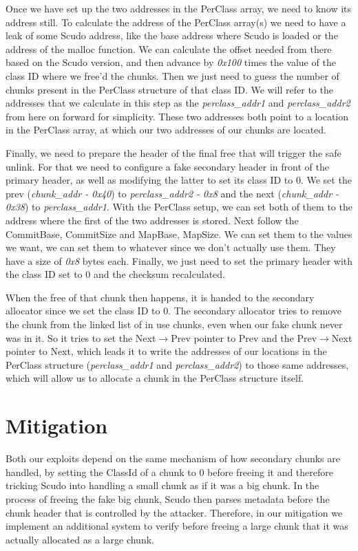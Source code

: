 \documentclass[a4paper,11pt,oneside]{report}
\begin{document}
Once we have set up the two addresses in the PerClass array, we need to know its address
still. To calculate the address of the PerClass array(s) we need to have a leak of some
Scudo address, like the base address where Scudo is loaded or the address of the malloc
function. We can calculate the offset needed from there based on the Scudo version, and
then advance by \emph{0x100} times the value of the class ID where we free'd the
chunks. Then we just need to guess the number of chunks present in the PerClass structure
of that class ID. We will refer to the addresses that we calculate in this step as the
\emph{perclass\_addr1} and \emph{perclass\_addr2} from here on forward for simplicity. These
two addresses both point to a location in the PerClass array, at which our two addresses
of our chunks are located.

Finally, we need to prepare the header of the final free that will trigger the safe
unlink. For that we need to configure a fake secondary header in front of the primary
header, as well as modifying the latter to set its class ID to 0. We set the prev
(\emph{chunk\_addr - 0x40}) to \emph{perclass\_addr2 - 0x8} and the next
(\emph{chunk\_addr - 0x38}) to \emph{perclass\_addr1}. With the PerClass setup, we
can set both of them to the address where the first of the two addresses is stored.  Next
follow the CommitBase, CommitSize and MapBase, MapSize. We can set them to the values we
want, we can set them to whatever since we don't actually use them. They have a size of
\emph{0x8} bytes each.  Finally, we just need to set the primary header with the class ID
set to 0 and the checksum recalculated.

When the free of that chunk then happens, it is handed to the secondary allocator since we
set the class ID to 0. The secondary allocator tries to remove the chunk from the linked
list of in use chunks, even when our fake chunk never was in it. So it tries to set the
Next$\rightarrow$Prev pointer to Prev and the Prev$\rightarrow$Next pointer to Next, which
leads it to write the addresses of our locations in the PerClass structure
(\emph{perclass\_addr1} and \emph{perclass\_addr2}) to those same addresses, which will
allow us to allocate a chunk in the PerClass structure itself.

\chapter{Mitigation}

Both our exploits depend on the same mechanism of how secondary chunks are handled, by setting
the ClassId of a chunk to 0 before freeing it and therefore tricking Scudo into handling a
small chunk as if it was a big chunk. In the process of freeing the fake big chunk, Scudo
then parses metadata before the chunk header that is controlled by the attacker.
Therefore, in our mitigation we implement an additional system to verify before freeing a
large chunk that it was actually allocated as a large chunk.
\end{document}

